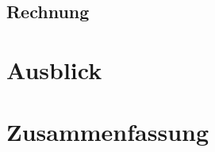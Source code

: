 \begin{refsection}
\subsection{Rechnung}

\section{Ausblick} 

\section{Zusammenfassung}

\printbibliography[heading=subbibliography]
\end{refsection}

